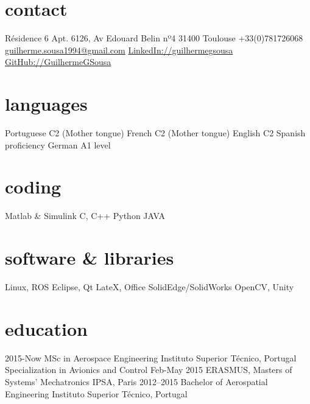 \documentclass[a4paper]{friggeri-cv} %
\begin{document}


\begin{aside} %
\section{contact}
Résidence 6 Apt. 6126, Av Edouard Belin nº4
31400 Toulouse
+33(0)781726068
\href{mailto:guilherme.sousa1994@gmail.com}{guilherme.sousa1994\newline @gmail.com}
\href{https://www.linkedin.com/in/guilhermegsousa}{LinkedIn://guilhermegsousa}
\href{https://github.com/GuilhermeGSousa}{GitHub://GuilhermeGSousa}
\section{languages}
Portuguese C2 (Mother tongue)
French C2 (Mother tongue)
English C2
Spanish proficiency
German A1 level
\section{coding}
Matlab \& Simulink
C, C++
Python
JAVA
\section{software \& libraries}
Linux, ROS
Eclipse, Qt
LateX, Office
SolidEdge/SolidWorks
OpenCV, Unity
\end{aside}


\section{education}

\begin{entrylist}

\entry
{2015-Now}
{MSc {\normalfont in Aerospace Engineering}}
{Instituto Superior Técnico, Portugal}
{Specialization in Avionics and Control}%
\entry
{Feb-May 2015}
{ERASMUS, Masters {\normalfont of Systems' Mechatronics} }
{IPSA, Paris}
{}
\entry
{2012--2015}
{Bachelor {\normalfont of Aerospatial Engineering}}
{Instituto Superior Técnico, Portugal}
{}








\end{entrylist}
\end{document}
